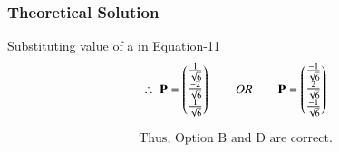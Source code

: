 \documentclass{beamer}
\begin{document}
\begin{frame}[fragile]
    \frametitle{Theoretical Solution}
    Substituting value of a in Equation-11
\begin{align}
    \therefore \; \mathbf{P} = \begin{pmatrix}\frac{1}{\sqrt{6}} \\ \frac{-2}{\sqrt{6}} \\ \frac{1}{\sqrt{6}}\end{pmatrix} 
     \qquad OR \qquad
    \mathbf{P} = \begin{pmatrix}\frac{-1}{\sqrt{6}} \\ \frac{2}{\sqrt{6}} \\ \frac{-1}{\sqrt{6}}\end{pmatrix}
    \end{align}

\begin{align*}
    \boxed{\text{Thus, Option B and D are correct.}}
\end{align*}
\end{frame}
\end{document}
